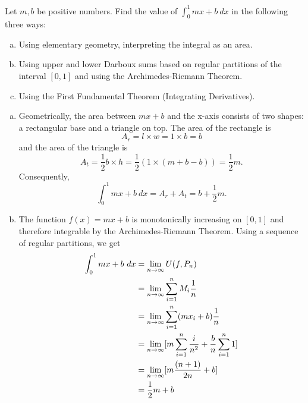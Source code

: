 \documentclass[letterpaper, twoside, 12pt]{book}
\begin{document}
\begin{exercise}[1]
  Let \(m,b\) be positive numbers. Find the value of \(\int_0^1 mx+b ~dx\)
  in the following three ways:
  \begin{enumerate}[(a)]
    \item Using elementary geometry, interpreting the integral as an area.
    \item Using upper and lower Darboux sums based on regular partitions of
      the interval \([0,1]\) and using the Archimedes-Riemann Theorem.
    \item Using the First Fundamental Theorem (Integrating Derivatives).
  \end{enumerate}
\end{exercise}

\begin{solution}
    \begin{enumerate}[(a)]
        \item Geometrically, the area between \(mx + b\) and the x-axis consists
              of two shapes: a rectangular base and a triangle on top. The area
              of the rectangle is \[A_r = l \times w = 1 \times b = b\] and the area
              of the triangle is 
              \[ A_t = \frac{1}{2} b \times h = \frac{1}{2}(1 \times (m + b - b)) = \frac{1}{2} m .\]
              Consequently,
              \[ \int_0^1 mx + b ~dx = A_r + A_t = b + \frac{1}{2} m .\]
        \item The function \(f(x) = mx + b\) is monotonically increasing on \([0,1]\) 
              and therefore integrable by the Archimedes-Riemann Theorem. Using a sequence
              of regular partitions, we get
              \begin{align*}
                  \int_0^1 mx + b ~dx &= \lim_{n \to \infty} U(f, P_n)\\
                                      &= \lim_{n \to \infty} \sum_{i = 1}^n M_i \frac{1}{n} \\
                                      &= \lim_{n \to \infty} \sum_{i = 1}^n (mx_i + b) \frac{1}{n} \\
                                      &= \lim_{n \to \infty} [ m \sum_{i = 1}^n \frac{i}{n^2} + \frac{b}{n} \sum_{i = 1}^n 1 ] \\
                                      &= \lim_{n \to \infty} [ m \frac{(n+1)}{2n} + b ] \\
                                      &= \frac{1}{2}m + b \\
              \end{align*}


\end{enumerate}
\end{solution}
\end{document}
